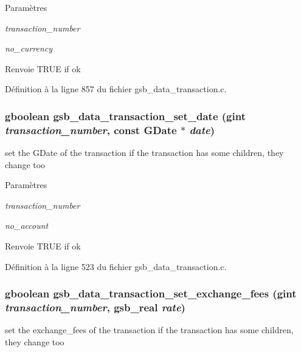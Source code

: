 \begin{DoxyParams}{Paramètres}
\item[{\em transaction\_\-number}]\item[{\em no\_\-currency}]\end{DoxyParams}
\begin{DoxyReturn}{Renvoie}
TRUE if ok 
\end{DoxyReturn}


Définition à la ligne 857 du fichier gsb\_\-data\_\-transaction.c.

\subsubsection[{gsb\_\-data\_\-transaction\_\-set\_\-date}]{\setlength{\rightskip}{0pt plus 5cm}gboolean gsb\_\-data\_\-transaction\_\-set\_\-date (gint {\em transaction\_\-number}, \/  const GDate $\ast$ {\em date})}\label{gsb__data__transaction_8c_a1e1d28bf9c59c6e0f24eaaa68769d302}
set the GDate of the transaction if the transaction has some children, they change too


\begin{DoxyParams}{Paramètres}
\item[{\em transaction\_\-number}]\item[{\em no\_\-account}]\end{DoxyParams}
\begin{DoxyReturn}{Renvoie}
TRUE if ok 
\end{DoxyReturn}


Définition à la ligne 523 du fichier gsb\_\-data\_\-transaction.c.

\subsubsection[{gsb\_\-data\_\-transaction\_\-set\_\-exchange\_\-fees}]{\setlength{\rightskip}{0pt plus 5cm}gboolean gsb\_\-data\_\-transaction\_\-set\_\-exchange\_\-fees (gint {\em transaction\_\-number}, \/  {\bf gsb\_\-real} {\em rate})}\label{gsb__data__transaction_8c_a46915d31d731950c840d3ea7b8caf226}
set the exchange\_\-fees of the transaction if the transaction has some children, they change too


